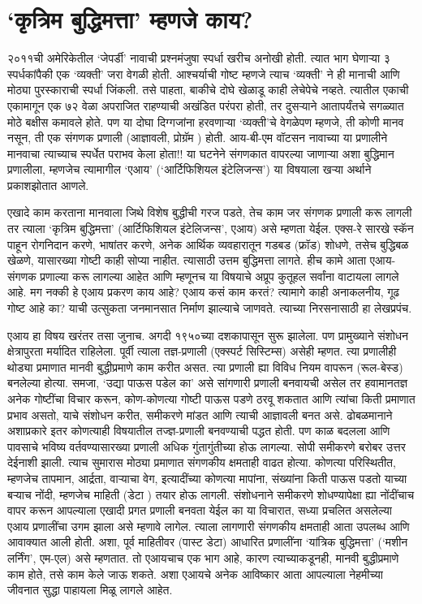 \chapter{`कृत्रिम बुद्धिमत्ता' म्हणजे काय?}

२०११ची अमेरिकेतील `जेपर्डी' नावाची प्रश्नमंजुषा स्पर्धा खरीच अनोखी होती. त्यात भाग घेणाऱ्या ३ स्पर्धकांपैकी एक `व्यक्ती' जरा वेगळी होती. आश्चर्याची गोष्ट म्हणजे त्याच  `व्यक्ती' ने ही मानाची आणि मोठ्या पुरस्काराची स्पर्धा जिंकली. तसे पाहता, बाकीचे दोघे खेळाडू काही लेचेपेचे नव्हते. त्यातील एकाची एकामागून एक ७२ वेळा अपराजित राहण्याची अखंडित परंपरा होती, तर दुसऱ्याने आतापर्यंतचे सगळ्यात मोठे बक्षीस कमावले होते. पण या दोघा दिग्गजांना हरवणाऱ्या `व्यक्ती'चे वेगळेपण म्हणजे, ती कोणी मानव नसून, ती एक संगणक प्रणाली (आज्ञावली, प्रोग्रॅम ) होती. आय-बी-एम वॉटसन   नावाच्या या प्रणालीने मानवाचा त्याच्याच स्पर्धेत पराभव केला होता!! या घटनेने संगणकात वापरल्या जाणाऱ्या अशा बुद्धिमान प्रणालीला, म्हणजेच त्यामागील `एआय' (`आर्टिफिशियल इंटेलिजन्स') या विषयाला खऱ्या अर्थाने प्रकाशझोतात आणले.

एखादे काम करताना मानवाला जिथे विशेष बुद्धीची गरज पडते, तेच काम जर संगणक प्रणाली करू लागली तर त्याला `कृत्रिम बुद्धिमत्ता' (आर्टिफिशियल इंटेलिजन्स', एआय) असे म्हणता येईल. एक्स-रे सारखे स्कॅन पाहून रोगनिदान करणे, भाषांतर करणे, अनेक आर्थिक व्यवहारातून गडबड (फ्रॉड) शोधणे, तसेच बुद्धिबळ खेळणे, यासारख्या गोष्टी काही सोप्या नाहीत. त्यासाठी उत्तम बुद्धिमत्ता लागते. हीच कामे आता एआय-संगणक प्रणाल्या करू लागल्या आहेत आणि म्हणूनच या विषयाचे अप्रूप कुतूहल सर्वांना वाटायला लागले आहे. मग नक्की हे एआय प्रकरण काय आहे? एआय कसं काम करतं? त्यामागे काही अनाकलनीय, गूढ गोष्ट आहे का? याची उत्सुकता जनमानसात निर्माण झाल्याचे जाणवते. त्याच्या निरसनासाठी हा लेखप्रपंच.

एआय हा विषय खरंतर तसा जुनाच. अगदी १९५०च्या दशकापासून सुरू झालेला. पण प्रामुख्याने संशोधन क्षेत्रापुरता मर्यादित राहिलेला. पूर्वी त्याला तज्ञ-प्रणाली (एक्स्पर्ट सिस्टिम्स) असेही म्हणत. त्या प्रणालीही थोड्या प्रमाणात मानवी बुद्धीप्रमाणे काम करीत असत. त्या प्रणाली ह्या विविध नियम वापरून (रूल-बेस्ड) बनलेल्या होत्या. समजा, `उद्या पाऊस पडेल का' असे सांगणारी प्रणाली बनवायची असेल तर हवामानतज्ञ अनेक गोष्टींचा विचार करून, कोण-कोणत्या गोष्टी पाऊस पडणे ठरवू शकतात आणि त्यांचा किती प्रमाणात प्रभाव असतो, याचे संशोधन करीत, समीकरणे मांडत आणि त्याची आज्ञावली बनत असे. ढोबळमानाने अशाप्रकारे इतर कोणत्याही विषयातील तज्ज्ञ-प्रणाली बनवण्याची पद्धत होती. पण काळ बदलला आणि पावसाचे भविष्य वर्तवण्यासारख्या प्रणाली अधिक गुंतागुंतीच्या होऊ लागल्या. सोपी समीकरणे बरोबर उत्तर देईनाशी झाली. त्याच सुमारास मोठ्या प्रमाणात संगणकीय क्षमताही वाढत होत्या. कोणत्या परिस्थितीत, म्हणजेच तापमान, आर्द्रता, वाऱ्याचा वेग, इत्यादींच्या कोणत्या मापांना, संख्यांना किती पाऊस पडतो याच्या बऱ्याच नोंदी, म्हणजेच माहिती (डेटा ) तयार होऊ लागली. संशोधनाने समीकरणे शोधण्यापेक्षा ह्या नोंदींचाच वापर करून आपल्याला एखादी प्रगत प्रणाली बनवता येईल का या विचारात, सध्या प्रचलित असलेल्या एआय प्रणालींचा उगम झाला असे म्हणावे लागेल. त्याला लागणारी संगणकीय क्षमताही आता उपलब्ध आणि आवाक्यात आली होती. अशा, पूर्व माहितीवर (पास्ट डेटा) आधारित प्रणालींना `यांत्रिक बुद्धिमत्ता' (`मशीन लर्निंग', एम-एल) असे म्हणतात. तो एआयचाच एक भाग आहे, कारण त्याच्याकडूनही, मानवी बुद्धीप्रमाणे काम होते, तसे काम केले जाऊ शकते. अशा एआयचे अनेक आविष्कार आता आपल्याला नेहमीच्या जीवनात सुद्धा पाहायला मिळू लागले आहेत.

